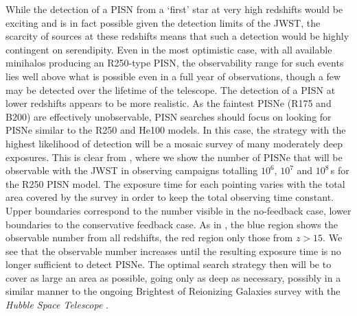 \documentclass[../thesis.tex]{subfiles}
\begin{document}
While the detection of a PISN from a `first' star at very high
redshifts would be exciting and is in fact possible given the
detection limits of the JWST, the scarcity of sources at these
redshifts means that such a detection would be highly contingent on
serendipity. Even in the most optimistic case, with all available
minihalos producing an R250-type PISN, the observability range for
such events lies well above what is possible even in a full year of
observations, though a few may be detected over the lifetime of the
telescope.  The detection of a PISN at lower redshifts appears to be
more realistic.  As the faintest PISNe (R175 and B200) are effectively
unobservable, PISN searches should focus on looking for PISNe similar
to the R250 and He100 models.  In this case, the strategy with the
highest likelihood of detection will be a mosaic survey of many
moderately deep exposures.  This is clear from ,
where we show the number of PISNe that will be observable with the
JWST in observing campaigns totalling $10^6$, $10^7$ and $10^8\,$s for
the R250 PISN model. The exposure time for each pointing varies with
the total area covered by the survey in order to keep the total
observing time constant.  Upper boundaries correspond to the number
visible in the no-feedback case, lower boundaries to the conservative
feedback case. As in , the blue region shows the
observable number from all redshifts, the red region only those from
$z>15$.  We see that the observable number increases until the
resulting exposure time is no longer sufficient to detect PISNe.  The
optimal search strategy then will be to cover as large an area as
possible, going only as deep as necessary, possibly in a similar
manner to the ongoing Brightest of Reionizing Galaxies survey with the
\textit{Hubble Space Telescope} \citep{Trentietal2011, Bradleyetal2012}.
\end{document}
